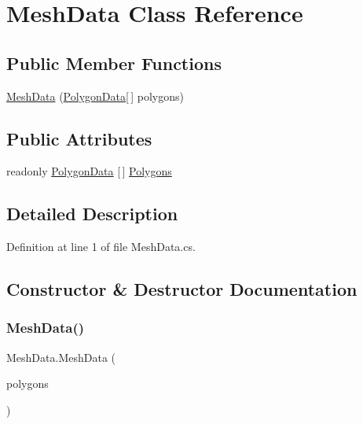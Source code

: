 \hypertarget{class_mesh_data}{}\section{Mesh\+Data Class Reference}
\label{class_mesh_data}
\subsection*{Public Member Functions}
\begin{DoxyCompactItemize}
\item 
\mbox{\hyperlink{class_mesh_data_a02257789afdb8f8ff6a2898129ba858e}{Mesh\+Data}} (\mbox{\hyperlink{class_polygon_data}{Polygon\+Data}}\mbox{[}$\,$\mbox{]} polygons)
\end{DoxyCompactItemize}
\subsection*{Public Attributes}
\begin{DoxyCompactItemize}
\item 
readonly \mbox{\hyperlink{class_polygon_data}{Polygon\+Data}} \mbox{[}$\,$\mbox{]} \mbox{\hyperlink{class_mesh_data_a4c8bf9097af78b726829adfc21694da1}{Polygons}}
\end{DoxyCompactItemize}


\subsection{Detailed Description}


Definition at line 1 of file Mesh\+Data.\+cs.



\subsection{Constructor \& Destructor Documentation}
\mbox{\label{class_mesh_data_a02257789afdb8f8ff6a2898129ba858e}} 
\subsubsection{\texorpdfstring{MeshData()}{MeshData()}}
{\footnotesize\ttfamily Mesh\+Data.\+Mesh\+Data (\begin{DoxyParamCaption}\item[{\mbox{\hyperlink{class_polygon_data}{Polygon\+Data}} \mbox{[}$\,$\mbox{]}}]{polygons }\end{DoxyParamCaption})}



